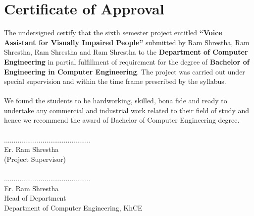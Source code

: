 		\large
			\chapter*{Certificate of Approval}
		\normalsize 
		    The undersigned certify that the sixth semester project entitled \textbf{“Voice Assistant for Visually Impaired People”} submitted by Ram Shrestha, Ram Shrestha, Ram Shrestha and Ram Shrestha to the \textbf{Department of Computer Engineering} in partial fulfillment of requirement for the degree of \textbf{Bachelor of Engineering in Computer Engineering}. The project was carried out under special supervision and within the time frame prescribed by the syllabus. \\ 
		    \\
			We found the students to be hardworking, skilled, bona fide and ready to undertake any commercial and industrial work related to their field of study and hence we recommend the award of Bachelor of Computer Engineering degree. \\
			\vspace{2cm} \\
			.............................................\\
			Er. Ram Shrestha\\
			(Project Supervisor)\\
			\vspace{1cm}\\
			.............................................\\
			Er. Ram Shrestha\\
			Head of Department \\
			Department of Computer Engineering, KhCE\\
		\break



		\large
